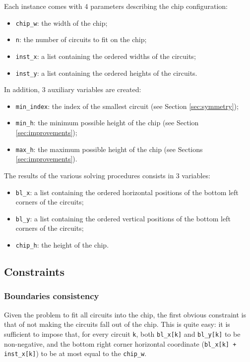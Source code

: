 \documentclass[a4paper, 12pt]{article}
\begin{document}
Each instance comes with 4 parameters describing the chip configuration:
\begin{itemize}
	\item \verb+chip_w+: the width of the chip;
	\item \verb+n+: the number of circuits to fit on the chip;
	\item \verb+inst_x+: a list containing the ordered widths of the circuits;
	\item \verb+inst_y+: a list containing the ordered heights of the circuits.
\end{itemize}
In addition, 3 auxiliary variables are created:
\begin{itemize}
	\item \verb+min_index+: the index of the smallest circuit (see Section \ref{sec:symmetry});
	\item \verb+min_h+: the minimum possible height of the chip (see Section \ref{sec:improvements});
	\item \verb+max_h+: the maximum possible height of the chip (see Sections \ref{sec:improvements}).
\end{itemize}
The results of the various solving procedures consists in 3 variables:
\begin{itemize}
	\item \verb+bl_x+: a list containing the ordered horizontal positions of the bottom left corners of the circuits;
	\item \verb+bl_y+: a list containing the ordered vertical positions of the bottom left corners of the circuits;
	\item \verb+chip_h+: the height of the chip.
\end{itemize}


\subsection{Constraints}

\subsubsection{Boundaries consistency}
Given the problem to fit all circuits into the chip, the first obvious constraint is that of not making the circuits fall out of the chip. This is quite easy: it is sufficient to impose that, for every circuit \verb|k|, both \verb|bl_x[k]| and \verb|bl_y[k]| to be non-negative, and the bottom right corner horizontal coordinate (\verb|bl_x[k] + inst_x[k]|) to be at most equal to the \verb|chip_w|.
\end{document}
